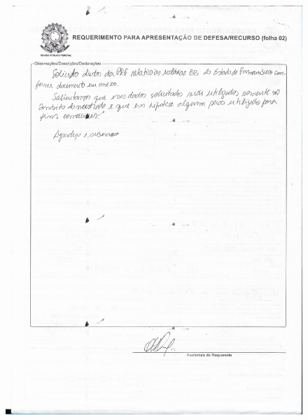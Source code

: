 \begin{figure}[ht!]
		\includegraphics[scale=0.30]{Figuras/Anexos/A1-PRFDadospg_002.pdf}
		\qquad \quad \quad

\end{figure}
